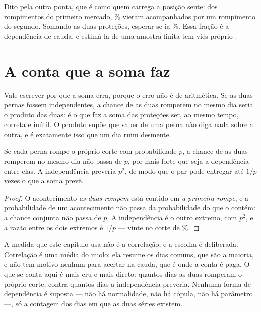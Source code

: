 Dito pela outra ponta, que é como quem carrega a posição sente: dos \numDependenciaRompeA{}
rompimentos do primeiro mercado, \numDependenciaAcompanhadosPct\% vieram acompanhados por um
rompimento do segundo. Somando as duas proteções, esperar-se-ia
\numDependenciaAcompanhadosIndependentePct\%. Essa fração é a dependência de cauda, e estimá-la de
uma amostra finita tem viés próprio \cite{garcin2026nonparametric}.

\section{A conta que a soma faz}

Vale escrever por que a soma erra, porque o erro não é de aritmética. Se as duas pernas fossem
independentes, a chance de as duas romperem no mesmo dia seria o produto das duas: é o que faz
a soma das proteções ser, ao mesmo tempo, correta e inútil. O produto supõe que saber de uma
perna não diga nada sobre a outra, e é exatamente isso que um dia ruim desmente.

\begin{proposicao}\label{prop:teto-do-par}
Se cada perna rompe o próprio corte com probabilidade $p$, a chance de as duas romperem no mesmo
dia não passa de $p$, por mais forte que seja a dependência entre elas. A independência preveria
$p^{2}$, de modo que o par pode entregar até $1/p$ vezes o que a soma prevê.
\end{proposicao}

\begin{proof}
O acontecimento \emph{as duas rompem} está contido em \emph{a primeira rompe}, e a probabilidade
de um acontecimento não passa da probabilidade do que o contém: a chance conjunta não passa de
$p$. A independência é o outro extremo, com $p^{2}$, e a razão entre os dois extremos é $1/p$ ---
vinte no corte de \numPromessaPct\%.
\end{proof}

A medida que este capítulo usa não é a correlação, e a escolha é deliberada. Correlação é uma
média do miolo: ela resume os dias comuns, que são a maioria, e não tem motivo nenhum para
acertar na cauda, que é onde a conta é paga. O que se conta aqui é mais cru e mais direto:
quantos dias as duas romperam o próprio corte, contra quantos dias a independência preveria.
Nenhuma forma de dependência é suposta --- não há normalidade, não há cópula, não há parâmetro
---, só a contagem dos dias em que as duas séries existem.

